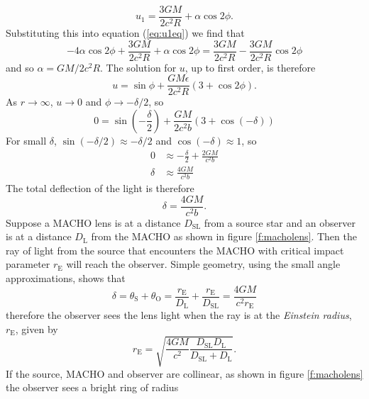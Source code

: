 \begin{equation}
u_1 = \frac{3GM}{2c^2 R} + \alpha \cos 2\phi.
\end{equation}
Substituting this into equation (\ref{eq:u1eq}) we find that
\begin{equation}
-4\alpha \cos 2\phi + \frac{3GM}{2c^2 R} + \alpha\cos 2\phi =
\frac{3GM}{2c^2 R} - \frac{3GM}{2c^2 R} \cos 2\phi
\end{equation}
and so $\alpha = GM/2c^2 R$. The solution for $u$, up to first order, is
therefore
\begin{equation}
u = \sin \phi + \frac{GM\epsilon}{2c^2 R}\left(3 + \cos 2\phi\right).
\end{equation}
As $r \rightarrow \infty$, $u \rightarrow 0$ and $\phi \rightarrow - \delta/2$,
so
\begin{equation}
0 = \sin \left(-\frac{\delta}{2}\right) + 
\frac{GM}{2c^2 b} \left(3 + \cos(-\delta)\right)
\end{equation}
For small $\delta$, $\sin(-\delta/2) \approx -\delta/2$ and $\cos(-\delta)
\approx 1$, so
\begin{align}
0 &\approx - \frac{\delta}{2} + \frac{2GM}{c^2 b} \\
\delta &\approx \frac{4GM}{c^2b}
\end{align}
The total deflection of the light is therefore
\begin{equation}
\delta = \frac{4GM}{c^2 b}.
\end{equation}
Suppose a MACHO lens is at a distance $D_\mathrm{SL}$ from a source star and
an observer is at a distance $D_\mathrm{L}$ from the MACHO as shown in figure
\ref{f:macholens}. Then the ray of light from the source that encounters
the MACHO with critical impact parameter $r_\mathrm{E}$ will reach the
observer. Simple geometry, using the small angle approximations, shows that
\begin{equation}
\delta = \theta_\mathrm{S} + \theta_\mathrm{O} =
\frac{r_\mathrm{E}}{D_\mathrm{L}} + \frac{r_\mathrm{E}}{D_\mathrm{SL}} =
\frac{4GM}{c^2r_\mathrm{E}}
\end{equation}
therefore the observer sees the lens light when the ray is at the
\emph{Einstein radius}, $r_\mathrm{E}$, given by
\begin{equation}
r_\mathrm{E} = \sqrt{\frac{4GM}{c^2} \frac{D_\mathrm{SL} D_\mathrm{L}}
{D_\mathrm{SL} + D_\mathrm{L}}}.
\end{equation}
If the source, MACHO and observer are collinear, as shown in figure
\ref{f:macholens} the observer sees a bright ring of radius
